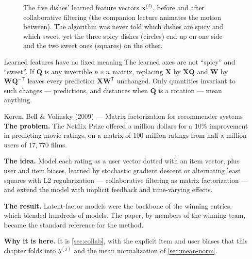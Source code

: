 \begin{figure}[htbp]
\begin{minipage}[t]{0.48\linewidth}
  \end{minipage}
  \caption{The five dishes' learned feature vectors $\mathbf{x}^{(i)}$, before and after
  collaborative filtering (the companion lecture animates the motion between).
  The algorithm was never told which dishes are spicy and which sweet, yet the
  three spicy dishes (circles) end up on one side and the two sweet ones
  (squares) on the other.}
  \label{fig:cf-features}
\end{figure}

\begin{pitfall}{Learned features have no fixed meaning}
The learned axes are not ``spicy'' and ``sweet''. If $\mathbf{Q}$ is any
invertible $n\times n$ matrix, replacing $\mathbf{X}$ by $\mathbf{X}\mathbf{Q}$
and $\mathbf{W}$ by $\mathbf{W}\mathbf{Q}^{-\mathsf T}$ leaves every prediction
$\mathbf{X}\mathbf{W}^{\mathsf T}$ unchanged. Only quantities invariant to such
changes --- predictions, and distances when $\mathbf{Q}$ is a rotation ---
mean anything.
\end{pitfall}

\begin{researchspotlight}{Koren, Bell \& Volinsky (2009) --- Matrix factorization for recommender systems}
\textbf{The problem.} The Netflix Prize offered a million dollars for a $10\%$
improvement in predicting movie ratings, on a matrix of $100$ million ratings
from half a million users of $17{,}770$ films.

\textbf{The idea.} Model each rating as a user vector dotted with an item vector,
plus user and item biases, learned by stochastic gradient descent or alternating
least squares with L2 regularization --- collaborative filtering as matrix
factorization --- and extend the model with implicit feedback and time-varying
effects.

\textbf{The result.} Latent-factor models were the backbone of the winning
entries, which blended hundreds of models. The paper, by members of the winning
team, became the standard reference for the method.

\textbf{Why it is here.} It is \cref{sec:collab}, with the explicit item and user
biases that this chapter folds into $b^{(j)}$ and the mean normalization of
\cref{sec:mean-norm}.
\parencite{koren2009}
\end{researchspotlight}

